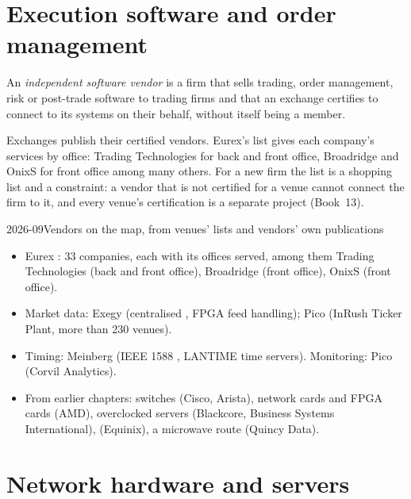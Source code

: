 \section{Execution software and order management}

\begin{definition}\label{def:nw:the-vendor-map:isv}
An \emph{independent software vendor} is a firm that sells trading, order management,
risk or post-trade software to trading firms and that an exchange certifies to connect to its systems on their behalf, without
itself being a member.
\end{definition}

Exchanges publish their certified vendors. Eurex's list gives each company's services by office: Trading Technologies for back
and front office, Broadridge and OnixS for front office among many others. For a new firm the list is a shopping list and a
constraint: a vendor that is not certified for a venue cannot connect the firm to it, and every venue's certification is a
separate project (Book~13).

\begin{dated}{2026-09}{Vendors on the map, from venues' lists and vendors' own publications}\label{dat:nw:the-vendor-map:lists}
\begin{itemize}
\item Eurex : 33 companies, each with its offices served, among them Trading Technologies (back
  and front office), Broadridge (front office), OnixS (front office).
\item Market data: Exegy (centralised , FPGA feed handling); Pico (InRush Ticker Plant, more than 230 venues).
\item Timing: Meinberg (IEEE 1588 , LANTIME time servers). Monitoring: Pico (Corvil Analytics).
\item From earlier chapters: switches (Cisco, Arista), network cards and FPGA cards (AMD), overclocked servers (Blackcore,
  Business Systems International),  (Equinix), a microwave route (Quincy Data).
\end{itemize}
\end{dated}

\section{Network hardware and servers}

